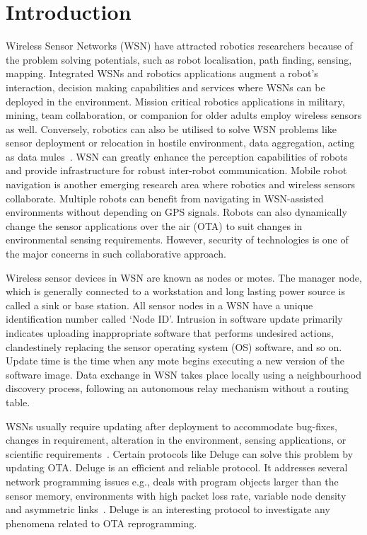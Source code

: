 \documentclass[conference,final]{IEEEtran}
\begin{document}
\section{Introduction}
\label{sec:intro}

Wireless Sensor Networks (WSN) have attracted robotics
researchers because of the problem solving potentials, such as
robot localisation, path finding, sensing, mapping. Integrated
WSNs and robotics applications augment a robot's interaction,
decision making capabilities and services where WSNs can be
deployed in the environment. Mission critical robotics applications in military, mining, team collaboration, or companion
for older adults employ wireless sensors as well. Conversely,
robotics can also be utilised to solve WSN problems like
sensor deployment or relocation in hostile environment, data aggregation, acting as data mules~\cite{Shue13}.
WSN can greatly enhance
the perception capabilities of robots and provide infrastructure
for robust inter-robot communication. Mobile robot navigation is another emerging research area where robotics and
wireless sensors collaborate. Multiple robots can benefit from
navigating in WSN-assisted environments without depending
on GPS signals. Robots can also dynamically change the
sensor applications over the air (OTA) to suit changes
in environmental sensing requirements. However, security of
technologies is one of the major concerns in such collaborative
approach.

Wireless sensor devices in WSN are known as nodes or
motes. The manager node, which is generally connected to
a workstation and long lasting power source is called a sink
or base station. All sensor nodes in a WSN have a unique
identification number called `Node ID'. Intrusion in software
update primarily indicates uploading inappropriate software
that performs undesired actions, clandestinely replacing the
sensor operating system (OS) software, and so on. Update time
is the time when any mote begins executing a new version
of the software image. Data exchange in WSN takes place
locally using a neighbourhood discovery process, following
an autonomous relay mechanism without a routing table.

WSNs usually require updating after deployment to accommodate bug-fixes, changes in requirement, alteration in
the environment, sensing applications, or scientific requirements~\cite{ISI:000253439700120}.
Certain protocols like Deluge can solve this problem
by updating OTA. Deluge is an efficient and reliable protocol.
It addresses several network programming issues e.g., deals
with program objects larger than the sensor memory, environments with high packet loss rate, variable node density
and asymmetric links~\cite{1031506}.
Deluge is an interesting protocol
to investigate any phenomena related to OTA reprogramming.
\end{document}
